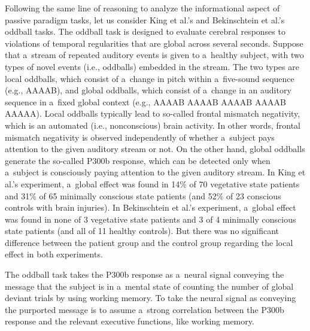 Following the same line of reasoning to analyze the informational aspect of passive paradigm tasks, let us consider King et al.'s
\parencite*[][]{lule_probing_2013} %
 and Bekinschtein et al.'s 
\parencite*[][]{schnakers_diagnostic_2009} %
 oddball tasks. The oddball task is designed to evaluate cerebral responses to violations of temporal regularities that are global across several seconds. Suppose that a~stream of repeated auditory events is given to a~healthy subject, with two types of novel events (i.e., oddballs) embedded in the stream. The two types are local oddballs, which consist of a~change in pitch within a~five-sound sequence (e.g., AAAAB), and global oddballs, which consist of a~change in an auditory sequence in a~fixed global context (e.g., AAAAB AAAAB AAAAB AAAAB AAAAA). Local oddballs typically lead to so-called frontal mismatch negativity, which is an automated (i.e., nonconscious) brain activity. In other words, frontal mismatch negativity is observed independently of whether a~subject pays attention to the given auditory stream or not. On the other hand, global oddballs generate the so-called P300b response, which can be detected only when a~subject is consciously paying attention to the given auditory stream. In King et al.'s 
\parencite*[][]{lule_probing_2013} %
 experiment, a~global effect was found in 14\% of 70 vegetative state patients and 31\% of 65 minimally conscious state patients (and 52\% of 23 conscious controls with brain injuries). In Bekinschtein et al.'s 
\parencite*[][]{schnakers_diagnostic_2009} %
 experiment, a~global effect was found in none of 3 vegetative state patients and 3 of 4 minimally conscious state patients (and all of 11 healthy controls). But there was no significant difference between the patient group and the control group regarding the local effect in both experiments.

The oddball task takes the P300b response as a~neural signal conveying the message that the subject is in a~mental state of counting the number of global deviant trials by using working memory. To take the neural signal as conveying the purported message is to assume a~strong correlation between the P300b response and the relevant executive functions, like working memory.

